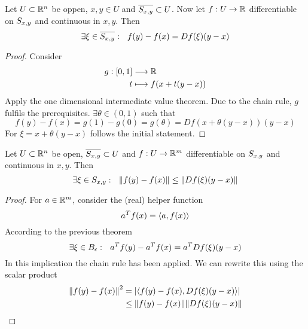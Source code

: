 \documentclass[../../script.tex]{subfiles}
\begin{document}
\begin{thm}
    Let $U \subset \mathbb{R}^n$ be oppen, $x, y \in U$ and $\overline{S_{{x,y}}} \subset U$.
    Now let $f: U \rightarrow \mathbb{R}$ differentiable on $S_{{x,y}}$ and continuous in $x, y$. Then 
    \[
        \exists \xi \in \overline{S_{{x,y}}}: ~~f(y) - f(x) = Df(\xi) (y-x)
    \]
\end{thm}
\begin{proof}
    Consider 
    \begin{equation}
    \begin{split}
        g: [0, 1] &\longrightarrow \mathbb{R} \\
        t &\longmapsto f(x + t(y - x))
    \end{split}
    \end{equation}
    Apply the one dimensional intermediate value theorem. Due to the chain rule, $g$ fulfils the prerequisites.
    $\exists \theta \in (0, 1)$ such that
    \begin{equation}
        f(y) - f(x) = g(1) - g(0) = g(\theta) = Df(x + \theta(y - x))(y - x)
    \end{equation}
    For $\xi = x + \theta(y - x)$ follows the initial statement.
\end{proof}

\begin{thm}
    Let $U \subset \mathbb{R}^n$ be open, $\overline{S_{{x,y}}} \subset U$ and $f: U \rightarrow \mathbb{R}^m$ differentiable on $S_{{x,y}}$ and continuous in $x, y$. Then 
    \[
        \exists \xi \in S_{{x,y}}: ~~\norm{f(y) - f(x)} \le \norm{Df(\xi)(y - x)}
    \]
\end{thm}
\begin{proof}
    For $a \in \mathbb{R}^m$, consider the (real) helper function 
    \begin{equation}
        a^Tf(x) = \langle a,f(x)\rangle
    \end{equation}
    According to the previous theorem
    \begin{equation}
        \exists \xi \in B_{\epsilon}: ~~a^T f(y) - a^T f(x) = a^T D f(\xi)(y - x)
    \end{equation}
    In this implication the chain rule has been applied. We can rewrite this using the scalar product
    \begin{equation}
        \begin{split}
            \norm{f(y) - f(x)}^2 &= \abs{\langle f(y) - f(x),Df(\xi)(y-x)\rangle} \\
            &\le \norm{f(y) - f(x)}\norm{Df(\xi)(y - x)}
        \end{split}
    \end{equation}
\end{proof}
\end{document}
